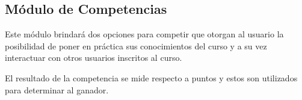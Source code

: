 

%

\subsection*{Módulo de Competencias}

 Este módulo brindará dos opciones para competir que otorgan al usuario
 la posibilidad de poner en práctica sus conocimientos del curso y a su vez
 interactuar con otros usuarios inscritos al curso.

 \noindent El resultado de la competencia se mide respecto a puntos y estos son
 utilizados para determinar al ganador.






